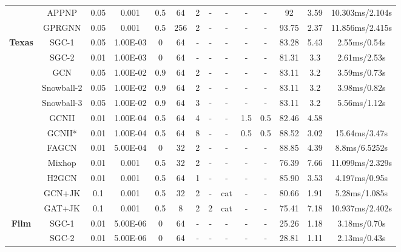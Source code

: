 \documentclass{article}
\newcommand{\0}{{\boldsymbol{0}}}
\newcommand{\6}{{\partial}}
\newcommand{\8}{{\infty}}
\newcommand{\4}{{\nabla}}
\begin{document}
\begin{table}[htbp]
{\begin{tabular}{c|c|cccccccccccc}
          & APPNP & 0.05  & 0.001 & 0.5   & 64    & 2     & - & - & -     & -     & 92    & 3.59  & {10.303ms/2.104s} \\
          & GPRGNN & 0.05  & 0.001 & 0.5   & 256   & 2     & - & - & -     & -     & 93.75 & 2.37  & {11.856ms/2.415s} \\
          \midrule
    \multirow{12}[0]{*}{\textbf{Texas}} & SGC-1 & 0.05  & 1.00E-03 & 0     & 64    & -     & -     & -     & -     & -     & 83.28 & 5.43  &  2.55ms/0.54s \\
          & SGC-2 & 0.01  & 1.00E-03 & 0     & 64    & -     & -     & -     & -     & -     & 81.31 & 3.3   & 2.61ms/2.53s \\
          & GCN   & 0.05  & 1.00E-02 & 0.9   & 64    & 2     & -     & -     & -     & -     & 83.11 & 3.2   & 3.59ms/0.73s \\
          & Snowball-2 & 0.05  & 1.00E-02 & 0.9   & 64    & 2     & -     & -     & -     & -     & 83.11 & 3.2   & 3.98ms/0.82s \\
          & Snowball-3 & 0.05  & 1.00E-02 & 0.9   & 64    & 3     & -     & -     & -     & -     & 83.11 & 3.2   & 5.56ms/1.12s \\
          & GCNII & 0.01  & 1.00E-04 & 0.5   & 64    & 4     & -     & -     & 1.5   & 0.5   & 82.46 & 4.58  &  \\
          & GCNII* & 0.01  & 1.00E-04 & 0.5   & 64    & 8     & -     & -     & 0.5   & 0.5   & 88.52 & 3.02  & 15.64ms/3.47s \\
          & FAGCN & 0.01  & 5.00E-04 & 0     & 32    & 2     & -     & -     & -     & -     & 88.85 & 4.39  & 8.8ms/6.5252s \\
          &  Mixhop & 0.01  & 0.001 & 0.5   & 32    & 2     & - & - & - & - & 76.39 & 7.66  & {11.099ms/2.329s} \\
          & H2GCN & 0.01  & 0.001 & 0.5   & 64    & 1     & - & - & - & - & 85.90 & 3.53  & {4.197ms/0.95s} \\
          & GCN+JK & 0.1   & 0.001 & 0.5   & 32    & 2     & - & {cat} & - & - & 80.66 & 1.91  & {5.28ms/1.085s} \\
          &  GAT+JK & 0.1   & 0.001 & 0.5   & 8     & 2     & 2     & {cat} & - & - & 75.41 & 7.18  & {10.937ms/2.402s} \\
          \midrule
    \multirow{12}[0]{*}{\textbf{Film}} & SGC-1 & 0.01  & 5.00E-06 & 0     & 64    & -     & -     & -     & -     & -     & 25.26 & 1.18  & 3.18ms/0.70s \\
          & SGC-2 & 0.01  & 5.00E-06 & 0     & 64    & -     & -     & -     & -     & -     & 28.81 & 1.11  &  2.13ms/0.43s \\

\end{tabular}}
\end{table}
\end{document}
